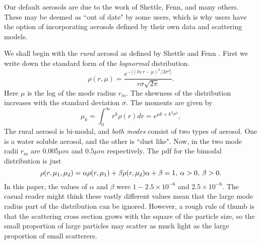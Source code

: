 \documentclass[12pt]{article}
\begin{document}
Our default aerosols are due to the work of Shettle, Fenn, and many others. These may be deemed as ``out of date"
 by some users, which is why users have the option of incorporating aerosols defined
 by their own data and scattering models.

We shall begin with the {\it rural} aerosol as defined by Shettle and Fenn \cite{ShettleFenn:Mybib}. First we write down
the standard form of the {\it lognormal} distribution.
\begin{equation}
\rho(r,\mu)=\frac{ e^{-\lbrack (ln \> r-\mu)^2/2 \sigma^2 \rbrack} }{ r \sigma \sqrt{2 \pi}}.
\end{equation}
Here $\mu$ is the log of the mode radius $r_m$. The skewness of the distribution
 increases with the standard deviation $\sigma$.
The moments are given by
\begin{equation}
\mu_k= \int_0^\infty r^k \rho(r) dr=e^{\mu k +k^2 \sigma^2},
\end{equation}
The rural aerosol is bi-modal, and {\it both modes} consist of two types of aerosol. One is a water
soluble aerosol, and the other is ``dust like".
 Now, in \cite{ShettleFenn:Mybib} the two mode radii $r_m$ are 0.005$\mu m$
and $0.5 \mu m$ respectively. The pdf for the bimodal distribution is just
\begin{equation}
\rho(r,\mu_1, \mu_2)=\alpha \rho(r, \mu_1)+\beta \rho(r, \mu_2)
$$   $$
\alpha+\beta=1, \> \alpha >0,  \> \beta >0.
\end{equation}
In this paper, the values of $\alpha$ and $\beta$ were $1-2.5 \times 10^{-6}$ and $2.5 \times 10^{-6}$.
The casual reader might think these vastly different values mean that the large mode radius part
of the distribution can be ignored. However, a rough rule of thumb is that the scattering cross
section grows with the square of the particle size, so the small proportion of large particles may 
scatter as much light as the large proportion of small scatterers.
\end{document}
